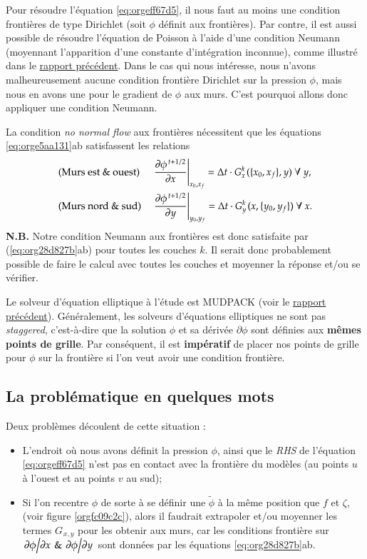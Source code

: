 \documentclass[10pt]{article}
\numberwithin{equation}{section}
\newcommand{\pt}{\hspace{1pt}}
\begin{document}
Pour résoudre l'équation \ref{eq:orgeff67d5}, il nous faut au moins une condition frontières de type Dirichlet (soit \(\phi\) définit aux frontières).
Par contre, il est aussi possible de résoudre l'équation de Poisson à l'aide d'une condition Neumann (moyennant l'apparition d'une constante d'intégration inconnue), comme illustré dans le \href{rapport-2023-04-21.org}{rapport précédent}.
Dans le cas qui nous intéresse, nous n'avons malheureusement aucune condition frontière Dirichlet sur la pression \(\phi\), mais nous en avons une pour le gradient de \(\phi\) aux murs.
C'est pourquoi allons donc appliquer une condition Neumann.\bigskip

La condition \emph{no normal flow} aux frontières nécessitent que les équations \ref{eq:orge5aa131}ab satisfassent les relations
\begin{subequations}
\label{eq:org28d827b}
\begin{align}
&& &\text{(Murs est \& ouest)}
&&\eval{\pdv{\phi^{\pt t+1/2}}{x}}_{x_0,x_f} =  \Delta t\cdot G^k_x\pt (\{x_0,x_f\},y)\ \forall\ y,&&\\
&& &\text{(Murs nord \& sud)}
&&\eval{\pdv{\phi^{\pt t+1/2}}{y}}_{y_0,y_f} =  \Delta t\cdot G^k_y\pt (x,\{y_0,y_f\})\ \forall\ x.&&
\end{align}
\end{subequations}
\textbf{N.B.} Notre condition Neumann aux frontières est donc satisfaite par (\ref{eq:org28d827b}ab) pour toutes les couches \(k\).
Il serait donc probablement possible de faire le calcul avec toutes les couches et moyenner la réponse et/ou se vérifier.\bigskip

Le solveur d'équation elliptique à l'étude est MUDPACK (voir le \href{rapport-2023-04-21.org}{rapport précédent}).
Généralement, les solveurs d'équations elliptiques ne sont pas \emph{staggered}, c'est-à-dire que la solution \(\phi\) et sa dérivée \(\partial\phi\) sont définies aux \textbf{mêmes points de grille}.
Par conséquent, il est \textbf{impératif} de placer nos points de grille pour \(\phi\) sur la frontière si l'on veut avoir une condition frontière.

\subsection{La problématique en quelques mots}
\label{sec:org2fd9793}

Deux problèmes découlent de cette situation :
\begin{itemize}
\item L'endroit où nous avons définit la pression \(\phi\), ainsi que le \emph{RHS} de l'équation \ref{eq:orgeff67d5} n'est pas en contact avec la frontière du modèles (au points \(u\) à l'ouest et au points \(v\) au sud);
\item Si l'on recentre \(\phi\) de sorte à se définir une \(\tilde{\phi}\) à la même position que \(f\) et \(\zeta\), (voir figure \ref{orgfc09c2c}), alors il faudrait extrapoler et/ou moyenner les termes \(G_{\pt x,y}\) pour les obtenir aux murs, car les conditions frontière sur \(\pdv*{\phi}{x}\pt \& \pt \pdv*{\phi}{y}\) sont données par les équations \ref{eq:org28d827b}ab.
\end{itemize}
\end{document}
